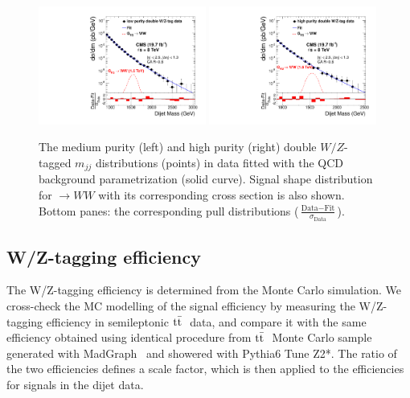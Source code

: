 \begin{figure}[th!b]
\begin{center}
\includegraphics[width=0.49\textwidth]{EXO-12-024/figs/MediumPuriVVFitAndPull.pdf}
\includegraphics[width=0.49\textwidth]{EXO-12-024/figs/HighPuriVVFitAndPull.pdf}
\end{center}
\caption{The medium purity (left) and high purity (right) double $W/Z$-tagged $m_{jj}$
  distributions (points) in data fitted with the QCD background parametrization (solid
  curve).  Signal shape distribution for
  \GRS$\to WW$ with its corresponding cross section is also shown.  Bottom panes:
  the corresponding pull distributions  ($\frac{\text{Data}-\text{Fit}}{\sigma_{\text{Data}}}$). 
  }
\label{fig:doubleVtagBG}
\end{figure}



\subsection{W/Z-tagging efficiency}
\label{sec:vtageff}

The W/Z-tagging efficiency is determined from the Monte Carlo simulation.
We cross-check the MC modelling of the signal efficiency by measuring the W/Z-tagging efficiency
in semileptonic $\mathrm{t}\bar{\mathrm{t}}~$ data, and compare it
with the same efficiency obtained using identical procedure from $\mathrm{t}\bar{\mathrm{t}}~$ Monte Carlo sample generated with MadGraph~\cite{madgraph} and showered with Pythia6 Tune Z2*.
The ratio of the two efficiencies defines a scale factor, which is then applied to
the efficiencies for signals in the dijet data.

